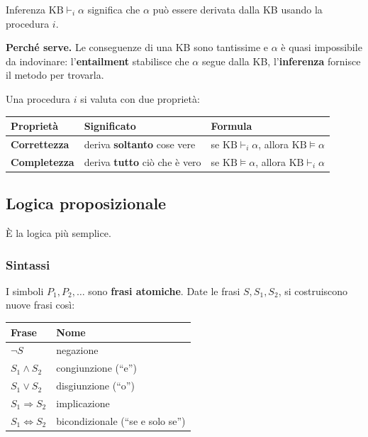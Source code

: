 \documentclass[11pt, a4paper]{article}
\newcommand{\intest}[1]{\textcolor{accento}{\sffamily\bfseries #1}}
\newcommand{\KB}{\mathrm{KB}}
\begin{document}
\begin{defbox}{Inferenza}
  $\KB \vdash_i \alpha$ significa che $\alpha$ può essere derivata dalla KB usando la procedura $i$.
\end{defbox}

\textbf{Perché serve.} Le conseguenze di una KB sono tantissime e $\alpha$ è quasi impossibile da indovinare: l'\textbf{entailment} stabilisce che $\alpha$ segue dalla KB, l'\textbf{inferenza} fornisce il metodo per trovarla.

Una procedura $i$ si valuta con due proprietà:

\begin{center}
  \renewcommand{\arraystretch}{1.35}
  \begin{tabular}{>{\bfseries}l l l}
    \toprule
    \intest{Proprietà} & \intest{Significato} & \intest{Formula} \\
    \midrule
    Correttezza & deriva \textbf{soltanto} cose vere & se $\KB \vdash_i \alpha$, allora $\KB \models \alpha$ \\
    Completezza & deriva \textbf{tutto} ciò che è vero & se $\KB \models \alpha$, allora $\KB \vdash_i \alpha$ \\
    \bottomrule
  \end{tabular}
\end{center}

\clearpage
\subsection{Logica proposizionale}

È la logica più semplice.

\subsubsection*{Sintassi}

I simboli $P_1, P_2, \dots$ sono \textbf{frasi atomiche}. Date le frasi $S, S_1, S_2$, si costruiscono nuove frasi così:

\begin{center}
  \renewcommand{\arraystretch}{1.25}
  \begin{tabular}{l l}
    \toprule
    \intest{Frase} & \intest{Nome} \\
    \midrule
    $\lnot S$ & negazione \\
    $S_1 \land S_2$ & congiunzione (``e'') \\
    $S_1 \lor S_2$ & disgiunzione (``o'') \\
    $S_1 \Rightarrow S_2$ & implicazione \\
    $S_1 \Leftrightarrow S_2$ & bicondizionale (``se e solo se'') \\
    \bottomrule
  \end{tabular}
\end{center}
\end{document}
